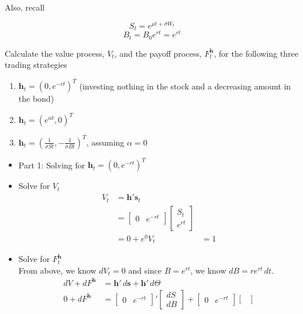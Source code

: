 \documentclass[11pt]{article}
\begin{document}
Also, recall

\[S_t = e^{\mu t + \sigma W_t}\]
\[B_t = B_0 e^{rt} = e^{rt}\]

Calculate the value process, $V_t$, and the payoff process, $F_t^{\boldsymbol{h}}$, for the 
following three trading strategies
\begin{enumerate}
    \item $\boldsymbol{h}_t = {(0, e^{-rt})}^T$ (investing nothing in the stock and a 
    decreasing amount in the bond)
    \item $\boldsymbol{h}_t = {(e^{\alpha t}, 0)}^T$
    \item $\boldsymbol{h}_t = {(\frac{1}{\sigma S t}, - \frac{1}{\sigma B t})}^T$, assuming 
    $\alpha = 0$
\end{enumerate}

\begin{itemize}
    \item Part 1: Solving for $\boldsymbol{h}_t = {(0, e^{-rt})}^T$ 
    \item Solve for $V_t$
    \begin{align*}
        V_t &= \boldsymbol{h}'\boldsymbol{s}_t \\
        &= 
        \begin{bmatrix} 0 & e^{-rt} \end{bmatrix}
        \begin{bmatrix}
            S_t \\ 
            e^{rt}
        \end{bmatrix} \\ 
        &= 0 + e^0
        V_t &= 1
    \end{align*}
    \item Solve for $F_t^{\boldsymbol{h}}$ \\
    From above, we know $dV_t = 0$ and since $B= e^{rt}$, we know $dB=re^{rt} \,dt$.
    \begin{align*}
        dV+dF^{\boldsymbol{h}}&=\boldsymbol{h}'\,d\boldsymbol{s}+\boldsymbol{h}'\,d\Theta \\ 
        0+dF^{\boldsymbol{h}}&=\begin{bmatrix} 0 & e^{-rt} \end{bmatrix}'\begin{bmatrix}
        dS \\ dB \end{bmatrix}+\begin{bmatrix} 0 & e^{-rt} \end{bmatrix}\begin{bmatrix}

\end{bmatrix}
\end{align*}
\end{itemize}
\end{document}
